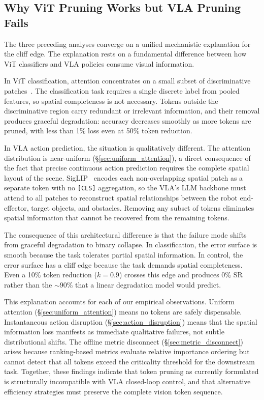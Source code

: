 \subsection{Why ViT Pruning Works but VLA Pruning Fails}
\label{sec:why_vit_works}

The three preceding analyses converge on a unified mechanistic explanation for the cliff edge.
The explanation rests on a fundamental difference between how ViT classifiers and VLA policies consume visual information.

In ViT classification, attention concentrates on a small subset of discriminative patches~\cite{rao2021dynamicvit,bolya2023tome,liang2022evit}.
The classification task requires a single discrete label from pooled features, so spatial completeness is not necessary.
Tokens outside the discriminative region carry redundant or irrelevant information, and their removal produces graceful degradation: accuracy decreases smoothly as more tokens are pruned, with less than 1\% loss even at 50\% token reduction.

In VLA action prediction, the situation is qualitatively different.
The attention distribution is near-uniform (\S\ref{sec:uniform_attention}), a direct consequence of the fact that precise continuous action prediction requires the complete spatial layout of the scene.
SigLIP~\cite{zhai2023siglip} encodes each non-overlapping spatial patch as a separate token with no \texttt{[CLS]} aggregation, so the VLA's LLM backbone must attend to all patches to reconstruct spatial relationships between the robot end-effector, target objects, and obstacles.
Removing any subset of tokens eliminates spatial information that cannot be recovered from the remaining tokens.

The consequence of this architectural difference is that the failure mode shifts from graceful degradation to binary collapse.
In classification, the error surface is smooth because the task tolerates partial spatial information.
In control, the error surface has a cliff edge because the task demands spatial completeness.
Even a 10\% token reduction ($k{=}0.9$) crosses this edge and produces 0\% SR rather than the ${\sim}$90\% that a linear degradation model would predict.

This explanation accounts for each of our empirical observations.
Uniform attention (\S\ref{sec:uniform_attention}) means no tokens are safely dispensable.
Instantaneous action disruption (\S\ref{sec:action_disruption}) means that the spatial information loss manifests as immediate qualitative failures, not subtle distributional shifts.
The offline metric disconnect (\S\ref{sec:metric_disconnect}) arises because ranking-based metrics evaluate relative importance ordering but cannot detect that all tokens exceed the criticality threshold for the downstream task.
Together, these findings indicate that token pruning as currently formulated is structurally incompatible with VLA closed-loop control, and that alternative efficiency strategies must preserve the complete vision token sequence.
